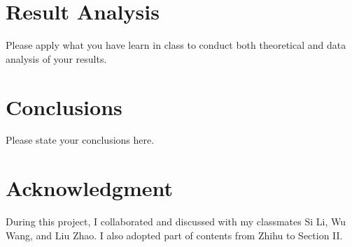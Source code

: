 \documentclass[10pt,journal]{IEEEtran}
\begin{document}
\section{Result Analysis}

Please apply what you have learn in class to conduct both theoretical and data analysis of your results.   


\section{Conclusions}

Please state your conclusions here. 

\section*{Acknowledgment}
During this project, I collaborated and discussed with my classmates Si Li, Wu Wang, and Liu Zhao. I also adopted part of contents from Zhihu \cite{Zhihu} to Section II.  





\end{document}

